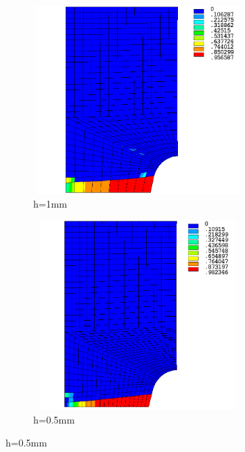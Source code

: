 \documentclass[12pt,twoside]{report}
\begin{document}
\\
\begin{figure}[htbp!]
 \centering
     \captionsetup[subfigure]{justification=centering}
     \begin{subfigure}{0.4\textwidth}
      \centering
         \includegraphics[width=8cm,height=7.2cm,keepaspectratio]{25.d2-1.png}
         \caption{h=1mm}
         \label{fig:d2-1}
     \end{subfigure}
     \hspace{1.8cm}
     \begin{subfigure}{0.4\textwidth}
      \centering
         \includegraphics[width=8cm,height=7.2cm,keepaspectratio]{25.d2-0.5.png}
         \caption{h=0.5mm}
         \label{fig:d2-0.5}
     \end{subfigure}
\end{figure}
\end{document}
